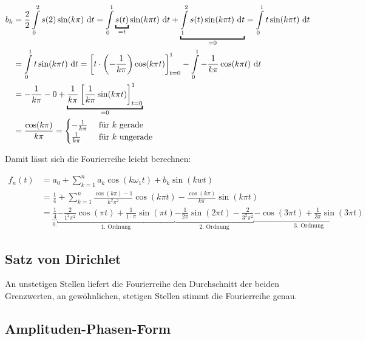 \begin{align*}
	b_k &= \frac{2}{2} \int\limits^2_0 s(2) \sin(k \pi) \dt 
		= \int\limits^1_0 \underbracket{s(t)}_{=t} \sin(k \pi t) \dt + \underbracket{\int\limits^2_1 s(t) \sin(k \pi t) \dt}_{=0} = \int\limits^1_0 t \sin(k \pi t) \dt \\
		&= \int\limits^1_0{t \sin(k \pi t)\dt} = \left[ t \cdot \left(-\frac{1}{k \pi}\right) \cos(k \pi t) \right]^1_{t=0} - \int\limits^1_0{ - \frac{1}{k \pi} \cos(k \pi t)\dt} \\
		&= -\frac{1}{k \pi} - 0 + \underbracket{\frac{1}{k \pi} \left[ \frac{1}{k \pi} \sin(k \pi t) \right]^1_{t=0}}_{\text{=0}} \\
		&= \frac{\cos(k \pi)}{k \pi} = \begin{cases}
			-\frac{1}{k \pi} & \text{ für } k \text{ gerade} \\
			\frac{1}{k \pi} & \text{ für } k \text{ ungerade}
		\end{cases}
\end{align*}

Damit lässt sich die Fourierreihe leicht berechnen:

\begin{align*}
f_n(t) &= a_0 + \sum^n_{k=1}{a_k \cos(k \omega_1 t) + b_k \sin(k w t)} \\
	   &= \frac{1}{4} + \sum^n_{k=1}{ \frac{\cos(k \pi) -1}{k^2 \pi^2} \cos(k \pi t) - \frac{\cos(k \pi)}{k \pi} \sin(k \pi t)} \\
	   &= \underbracket{\frac{1}{4}}_{\text{0.}}
	    \underbracket{-\frac{2}{1^2 \pi^2} \cos(\pi t) + \frac{1}{1 \cdot \pi} \sin(\pi t)}_{\text{1. Ordnung}}
	    \underbracket{-\frac{1}{2 \pi} \sin(2 \pi t) -\frac{2}{3^2 \pi^2}}_{\text{2. Ordnung}}
	    \underbracket{-\cos(3 \pi t) + \frac{1}{3 \pi} \sin(3 \pi t)}_{\text{3. Ordnung}}
\end{align*}

\subsection{Satz von Dirichlet}

An unstetigen Stellen liefert die Fourierreihe den Durchschnitt der beiden Grenzwerten, an gewöhnlichen, stetigen Stellen stimmt die Fourierreihe genau.

\subsection{Amplituden-Phasen-Form}

